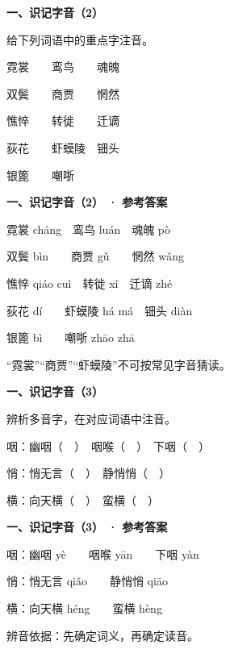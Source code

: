 \documentclass[UTF8,10pt,aspectratio=169]{ctexbeamer}
\newcommand{\PageHeading}[1]{\begin{center}{\Large\bfseries #1}\end{center}\vspace{0.2cm}}
\begin{document}
\begin{frame}
\PageHeading{一、识记字音（2）}
给下列词语中的重点字注音。\par\vspace{0.23cm}
霓裳　　鸾鸟　　魂魄\par\vspace{0.23cm}
双鬓　　商贾　　惘然\par\vspace{0.23cm}
憔悴　　转徙　　迁谪\par\vspace{0.23cm}
荻花　　虾蟆陵　钿头\par\vspace{0.23cm}
银篦　　嘲哳\par\vspace{0.23cm}
\end{frame}
\begin{frame}
\PageHeading{一、识记字音（2） · 参考答案}
霓裳 cháng　鸾鸟 luán　魂魄 pò\par\vspace{0.23cm}
双鬓 bìn　　商贾 gǔ　　惘然 wǎng\par\vspace{0.23cm}
憔悴 qiáo cuì　转徙 xǐ　迁谪 zhé\par\vspace{0.23cm}
荻花 dí　　虾蟆陵 há má　钿头 diàn\par\vspace{0.23cm}
银篦 bì　　嘲哳 zhāo zhā\par\vspace{0.23cm}
“霓裳”“商贾”“虾蟆陵”不可按常见字音猜读。\par\vspace{0.23cm}
\end{frame}
\begin{frame}
\PageHeading{一、识记字音（3）}
辨析多音字，在对应词语中注音。\par\vspace{0.23cm}
咽：幽咽（　）　咽喉（　）　下咽（　）\par\vspace{0.23cm}
悄：悄无言（　）　静悄悄（　）\par\vspace{0.23cm}
横：向天横（　）　蛮横（　）\par\vspace{0.23cm}
\end{frame}
\begin{frame}
\PageHeading{一、识记字音（3） · 参考答案}
咽：幽咽 yè　　咽喉 yān　　下咽 yàn\par\vspace{0.23cm}
悄：悄无言 qiǎo　　静悄悄 qiāo\par\vspace{0.23cm}
横：向天横 héng　　蛮横 hèng\par\vspace{0.23cm}
辨音依据：先确定词义，再确定读音。\par\vspace{0.23cm}
\end{frame}
\end{document}

